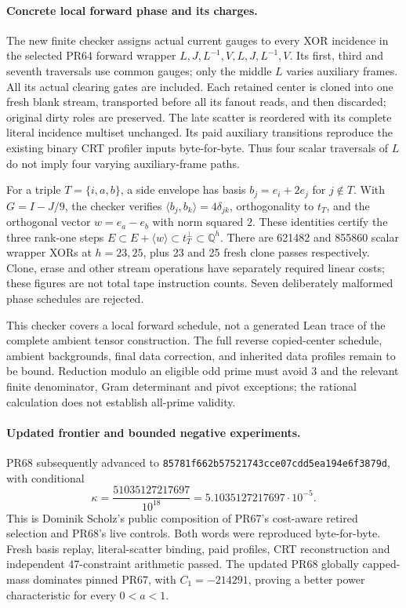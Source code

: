 \documentclass[11pt]{article}
\newcommand{\Q}{\mathbb Q}
\begin{document}
\paragraph{Concrete local forward phase and its charges.}
The new finite checker assigns actual current gauges to every XOR incidence
in the selected PR64 forward wrapper
$L,J,L^{-1},V,L,J,L^{-1},V$. Its first, third and seventh traversals use
common gauges; only the middle $L$ varies auxiliary frames. All its actual
clearing gates are included. Each retained center is cloned into one fresh
blank stream, transported before all its fanout reads, and then discarded;
original dirty roles are preserved. The late scatter is reordered with its
complete literal incidence multiset unchanged. Its paid auxiliary transitions
reproduce the existing binary CRT profiler inputs byte-for-byte. Thus four
scalar traversals of $L$ do not imply four varying auxiliary-frame paths.

For a triple $T=\{i,a,b\}$, a side envelope has basis
$b_j=e_i+2e_j$ for $j\notin T$. With $G=I-J/9$, the checker verifies
$\langle b_j,b_k\rangle=4\delta_{jk}$, orthogonality to $t_T$, and the
orthogonal vector $w=e_a-e_b$ with norm squared $2$. These identities
certify the three rank-one steps
$E\subset E+\langle w\rangle\subset t_T^\perp\subset\Q^h$.
There are 621482 and 855860 scalar wrapper XORs at $h=23,25$,
plus 23 and 25 fresh clone passes respectively. Clone, erase and other
stream operations have separately required linear costs; these figures
are not total tape instruction counts. Seven deliberately malformed phase
schedules are rejected.

This checker covers a local forward schedule, not a generated Lean trace
of the complete ambient tensor construction. The full reverse copied-center
schedule, ambient backgrounds, final data correction, and inherited data
profiles remain to be bound. Reduction modulo an eligible odd prime must
avoid 3 and the relevant finite denominator, Gram determinant and pivot
exceptions; the rational calculation does not establish all-prime validity.

\paragraph{Updated frontier and bounded negative experiments.}
PR68 subsequently advanced to
\texttt{85781f662b57521743cce07cdd5ea194e6f3879d}, with conditional
\[
 \kappa=\frac{51035127217697}{10^{18}}=5.1035127217697\cdot10^{-5}.
\]
This is Dominik Scholz's public composition of PR67's cost-aware retired
selection and PR68's live controls. Both words were reproduced
byte-for-byte. Fresh basis replay, literal-scatter binding, paid profiles,
CRT reconstruction and independent 47-constraint arithmetic passed.
The updated PR68 globally capped-mass dominates pinned PR67, with
$C_1=-214291$, proving a better power characteristic for every $0<a<1$.
\end{document}
